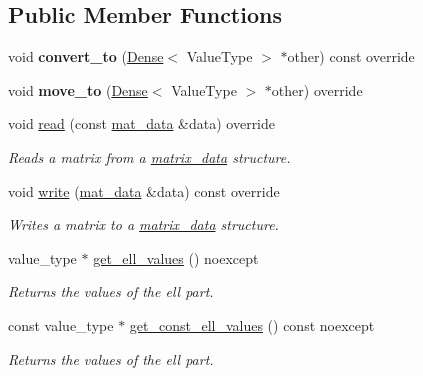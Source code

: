 \subsection*{Public Member Functions}
\begin{DoxyCompactItemize}
\item 
\mbox{\label{classgko_1_1matrix_1_1Hybrid_a84640a1655c79facb5b7776bed7b31f2}} 
void {\bfseries convert\+\_\+to} (\hyperlink{classgko_1_1matrix_1_1Dense}{Dense}$<$ Value\+Type $>$ $\ast$other) const override
\item 
\mbox{\label{classgko_1_1matrix_1_1Hybrid_a3e09a24869354c749e5e992611964e85}} 
void {\bfseries move\+\_\+to} (\hyperlink{classgko_1_1matrix_1_1Dense}{Dense}$<$ Value\+Type $>$ $\ast$other) override
\item 
void \hyperlink{classgko_1_1matrix_1_1Hybrid_a7eff2922ae21e9722b343ca1832d8bf5}{read} (const \hyperlink{structgko_1_1matrix__data}{mat\+\_\+data} \&data) override
\begin{DoxyCompactList}\small\item\em Reads a matrix from a \hyperlink{structgko_1_1matrix__data}{matrix\+\_\+data} structure. \end{DoxyCompactList}\item 
void \hyperlink{classgko_1_1matrix_1_1Hybrid_a626c07541641bcdfd9a7f61322a89cbe}{write} (\hyperlink{structgko_1_1matrix__data}{mat\+\_\+data} \&data) const override
\begin{DoxyCompactList}\small\item\em Writes a matrix to a \hyperlink{structgko_1_1matrix__data}{matrix\+\_\+data} structure. \end{DoxyCompactList}\item 
value\+\_\+type $\ast$ \hyperlink{classgko_1_1matrix_1_1Hybrid_a9cd9c8b8dbf8b3c2c014f355faa61474}{get\+\_\+ell\+\_\+values} () noexcept
\begin{DoxyCompactList}\small\item\em Returns the values of the ell part. \end{DoxyCompactList}\item 
const value\+\_\+type $\ast$ \hyperlink{classgko_1_1matrix_1_1Hybrid_af792e702c3650f4e77e8cb256250f21e}{get\+\_\+const\+\_\+ell\+\_\+values} () const noexcept
\begin{DoxyCompactList}\small\item\em Returns the values of the ell part. \end{DoxyCompactList}\item 

\end{DoxyCompactItemize}

